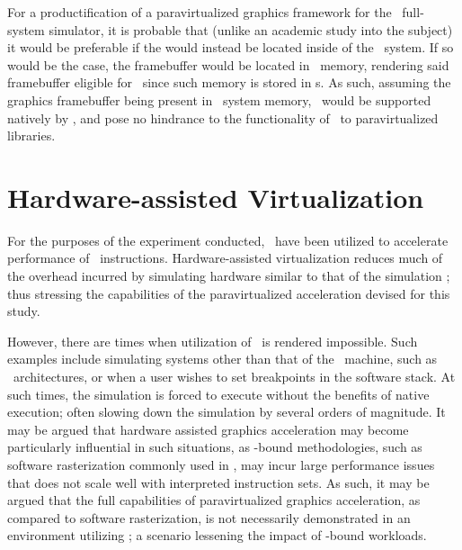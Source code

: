 For a productification of a paravirtualized graphics framework for the \dvttermsimics\ full-system simulator, it is probable that (unlike an academic study into the subject) it would be preferable if the would instead be located inside of the \dvttermtarget\ system.
If so would be the case, the framebuffer would be located in \dvttermtarget\ memory, rendering said framebuffer eligible for \dvttermreverseexecution\ since such memory is stored in \dvttermcheckpoint s.
As such, assuming the graphics framebuffer being present in \dvttermtarget\ system memory, \dvttermreverseexecution\ would be supported natively by \dvttermsimics , and pose no hindrance to the functionality of \dvttermreverseexecution\ to paravirtualized libraries.

\section{Hardware-assisted Virtualization}
\label{sec:discussion_hostvirtualizationextensions}
For the purposes of the experiment conducted, \dvttermdirectvirtualization\ have been utilized to accelerate performance of \dvttermxeightysix\ instructions.
Hardware-assisted virtualization reduces much of the overhead incurred by simulating hardware similar to that of the simulation \dvttermhost ; thus stressing the capabilities of the paravirtualized acceleration devised for this study.

However, there are times when utilization of \dvttermdirectvirtualization\ is rendered impossible.
Such examples include simulating systems other than that of the \dvttermhost\ machine, such as \dvttermarm\ architectures, or when a user wishes to set breakpoints in the software stack.
At such times, the simulation is forced to execute without the benefits of native execution; often slowing down the simulation by several orders of magnitude.
It may be argued that hardware assisted graphics acceleration may become particularly influential in such situations, as \dvttermcpu -bound methodologies, such as software rasterization commonly used in \dvttermsimics , may incur large performance issues that does not scale well with interpreted instruction sets.
As such, it may be argued that the full capabilities of paravirtualized graphics acceleration, as compared to software rasterization, is not necessarily demonstrated in an environment utilizing \dvttermdirectvirtualization ; a scenario lessening the impact of \dvttermcpu -bound workloads.

